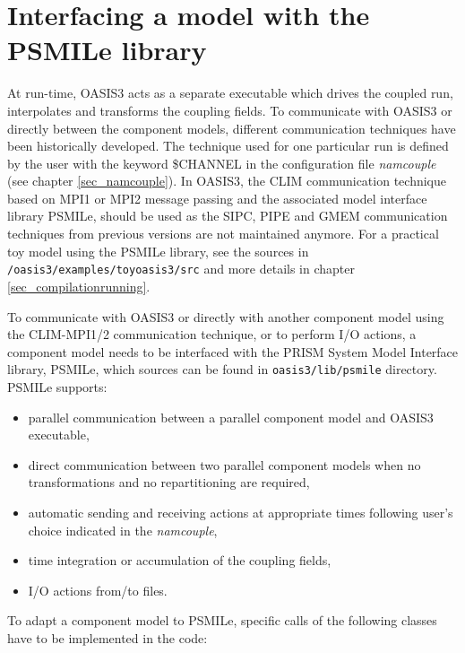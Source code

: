 \newpage
\chapter{Interfacing a model with the PSMILe library}
\label{sec_modelinterfacing}

At run-time, OASIS3 acts as a separate executable which
drives the coupled run, interpolates and transforms the coupling
fields. To communicate with OASIS3 or directly between the component
models, different communication techniques have been historically
developed. The technique used for one particular run is defined by the
user with the keyword \$CHANNEL in the configuration file {\it namcouple} 
(see chapter
\ref{sec_namcouple}). In OASIS3, the CLIM communication technique
based on MPI1 or MPI2 message passing and the associated model
interface library PSMILe, should be used as the SIPC, PIPE and
  GMEM communication techniques from previous versions are not maintained anymore. For
a practical toy model using the PSMILe library, see the sources in
{\tt /oasis3/examples/toyoasis3/src} and more details in
chapter \ref{sec_compilationrunning}.



 To communicate with OASIS3 or directly with another component model
 using the CLIM-MPI1/2 communication technique,
  or to perform I/O actions, a component model needs to be interfaced
  with the PRISM System Model Interface library, PSMILe, which sources
  can be found in {\tt oasis3/lib/psmile} directory. PSMILe supports:

\begin{itemize}
\item parallel communication between a parallel component
 model and OASIS3 executable,
\item direct communication between two parallel component models when no
 transformations and no repartitioning are required,
\item automatic sending and receiving actions at appropriate times
 following user's choice indicated in the {\it namcouple},
\item time integration or accumulation of the coupling fields,
\item I/O actions from/to files.
\end{itemize}

 To adapt a component model to PSMILe, specific calls of
 the following classes have to be implemented in the code:

